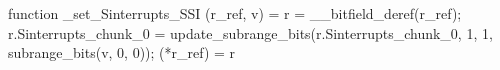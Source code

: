 function _set_Sinterrupts_SSI (r_ref, v) = {
    r = __bitfield_deref(r_ref);
    r.Sinterrupts_chunk_0 = update_subrange_bits(r.Sinterrupts_chunk_0, 1, 1, subrange_bits(v, 0, 0));
    (*r_ref) = r
}

